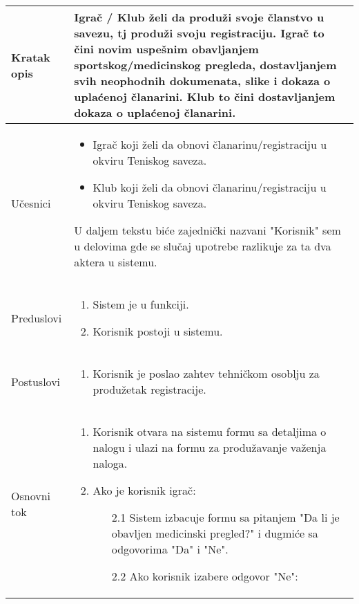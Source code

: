 \documentclass{article}
\begin{document}
       \begin{longtable}{| p{} | p{} |} 
            \hline
                Kratak opis & Igrač / Klub želi da produži svoje članstvo u savezu, tj produži svoju registraciju. Igrač to čini novim uspešnim obavljanjem sportskog/medicinskog pregleda, dostavljanjem svih neophodnih dokumenata, slike i dokaza o uplaćenoj članarini. Klub to čini dostavljanjem dokaza o uplaćenoj članarini.\\ 
            \hline    
                Učesnici & \begin{itemize}
                    \item Igrač koji želi da obnovi članarinu/registraciju u okviru Teniskog saveza.
                    \item Klub koji želi da obnovi članarinu/registraciju u okviru Teniskog saveza.
                \end{itemize}
                U daljem tekstu biće zajednički nazvani "Korisnik" sem u delovima gde se slučaj upotrebe razlikuje za ta dva aktera u sistemu.\\
            \hline
               Preduslovi & \begin{enumerate}
                   \item Sistem je u funkciji.
                   \item Korisnik postoji u sistemu.
               \end{enumerate}\\
            \hline  
                Postuslovi & \begin{enumerate}
                    \item Korisnik je poslao zahtev tehničkom osoblju za produžetak registracije.
                \end{enumerate}\\
            \hline
                Osnovni tok & \begin{enumerate}
                    \item Korisnik otvara na sistemu formu sa detaljima o nalogu i ulazi na formu za produžavanje važenja naloga.
                    \item Ako je korisnik igrač:
                    \begin{enumerate}
                         \item[2.1] Sistem izbacuje formu sa pitanjem "Da li je obavljen medicinski pregled?" i dugmiće sa odgovorima "Da" i "Ne".
                        \item[2.2] Ako korisnik izabere odgovor "Ne":

\end{enumerate}
\end{enumerate}
\end{longtable}
\end{document}

